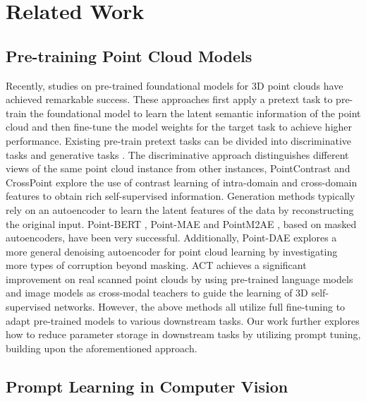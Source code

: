\documentclass[10pt,twocolumn,letterpaper]{article}
\begin{document}
\section{Related Work}

\subsection{Pre-training Point Cloud Models}

Recently, studies on pre-trained foundational models for 3D point clouds have achieved remarkable success. These approaches first apply a pretext task to pre-train the foundational model to learn the latent semantic information of the point cloud and then fine-tune the model 
 weights for the target task to achieve higher performance. Existing pre-train pretext tasks can be divided into discriminative tasks \cite{becker1992self,chen2020simple,gidaris2018unsupervised,wu2018unsupervised} and generative tasks \cite{baevski2022data2vec,dong2022autoencoders,he2022masked,lin2021end,liu2022masked,pang2022masked,yu2022point,zhang2022point}.
The discriminative approach distinguishes different views of the same point cloud instance from other instances, PointContrast \cite{xie2020pointcontrast} and CrossPoint \cite{afham2022crosspoint} explore the use of contrast learning of intra-domain and cross-domain features to obtain rich self-supervised information. Generation methods typically rely on an autoencoder to learn the latent features of the data by reconstructing the original input. Point-BERT \cite{yu2022point}, Point-MAE \cite{pang2022masked} and PointM2AE  \cite{zhang2022point}, based on masked autoencoders, have been very successful. Additionally, Point-DAE \cite{zhang2022point} explores a more general denoising autoencoder for point cloud learning by investigating more types of corruption beyond masking. ACT \cite{dong2022autoencoders} achieves a significant improvement on real scanned point clouds by using pre-trained language models and image models as cross-modal teachers to guide the learning of 3D self-supervised networks. However, the above methods all utilize full fine-tuning to adapt pre-trained models to various downstream tasks. Our work further explores how to reduce parameter storage in downstream tasks by utilizing prompt tuning, building upon the aforementioned approach.

\subsection{Prompt Learning in Computer Vision}
\end{document}

